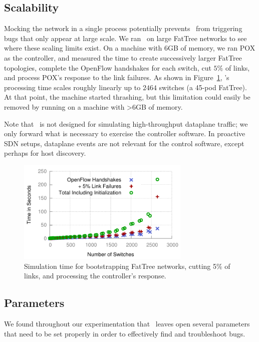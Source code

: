 \subsection{Scalability}

Mocking the network in a single process potentially prevents \projectname~from
triggering bugs that only appear at large scale. We ran
\projectname~on large FatTree networks to see where these scaling limits exist.
On a machine with 6GB of memory, we ran POX as the controller, and measured the
time to create successively larger FatTree
topologies, complete the OpenFlow handshakes for each switch,
cut $5\%$ of links, and process POX's response to the link failures. As shown in
Figure~\ref{fig:scaling}, \projectname's processing time scales roughly
linearly up to $2464$ switches (a 45-pod FatTree). At that point, the machine
started thrashing, but this limitation could easily be removed by running on a
machine with >6GB of memory.

Note that \projectname~is not designed for simulating high-throughput dataplane
traffic; we only forward what is necessary to exercise the controller
software. In proactive SDN setups, dataplane events are not
relevant for the control software, except perhaps for host discovery.

\begin{figure}[t]
    \includegraphics[width=3.25in]{../graphs/scalability/scaling.pdf}
    \caption[]{\label{fig:scaling} Simulation time for bootstrapping FatTree
    networks, cutting 5\% of links, and processing the controller's response.}
\end{figure}

\subsection{Parameters}
\label{subsec:params}

We found throughout our experimentation that \projectname~leaves open several
parameters that need to be set properly in order to effectively find and troubleshoot bugs.

